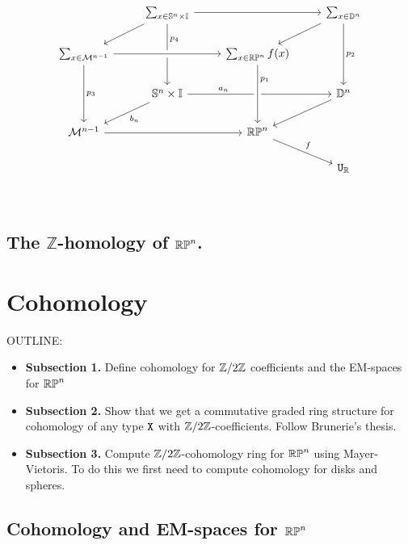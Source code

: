 \documentclass{amsart}
\begin{document}
\[\begin{tikzcd}
										& \sum_{x \in \set{S}^n \times \set{I}} \arrow[rr]	\arrow[ld] \arrow[dd, near start, "p_4"] &						& \sum_{x \in \set{D}^n} \arrow[ld] \arrow[dd, "p_2"]\\
\sum_{x \in \mathcal{M}^{n-1}} \arrow[rr, crossing over] \arrow[dd, "p_3"]&										& \sum_{x \in \set{RP}^n}f(x)				&	\\
										& \set{S}^n \times \set{I} \arrow[rr, near start, "a_n"] \arrow[ld, "b_n"]					&									& \set{D}^n \arrow [ld]\\
\mathcal{M}^{n-1} \arrow[rr]					&													& \set{RP}^n \ar[rd, "f"] 					& \\
										&													&									& \U_{\set{R}}\\
\arrow[from=2-3, to=4-3, crossing over, near start, "p_1"]
\end{tikzcd}
\]

\subsection{The $\mathbb{Z}$-homology of $\mathbb{RP}^n$.}

\section{Cohomology}
\label{sec:cohom}

OUTLINE:
\begin{itemize}
\item 
  \textbf{Subsection 1.} 
  Define cohomology for $ \mathbb{Z}/2\mathbb{Z} $ coefficients and the
  EM-spaces for $ \mathbb{RP}^n $ 
\item
  \textbf{Subsection 2.} Show that we get a commutative
  graded ring structure for cohomology of any type $ \mathtt{X} $
  with $ \mathbb{Z}/2\mathbb{Z} $-coefficients. Follow Brunerie's thesis.
\item
  \textbf{Subsection 3.} Compute $ \mathbb{Z}/2\mathbb{Z} $-cohomology ring
  for $ \mathbb{RP}^n $ using Mayer-Vietoris.  To do this we 
  first need to compute cohomology for disks and spheres.  
\end{itemize}


\subsection{Cohomology and EM-spaces for $\mathbb{RP}^n$}
\end{document}
